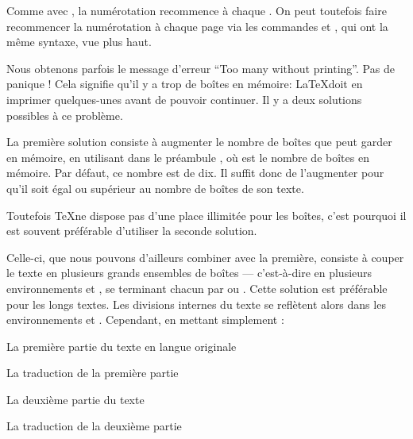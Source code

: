 \begin{attention}
Comme avec , la numérotation recommence à chaque . On peut toutefois faire recommencer la numérotation  à chaque page via les commandes  et , qui ont la même syntaxe, vue plus haut.
\end{attention}

Nous obtenons parfois le message d'erreur \enquote{Too many  without printing}. Pas de panique ! Cela signifie qu'il y a trop de boîtes en mémoire: \LaTeX  doit en imprimer quelques-unes avant de pouvoir continuer.  Il y a deux solutions possibles à ce problème.

La première solution consiste à  augmenter le nombre de boîtes que  peut garder en mémoire, en utilisant dans le préambule , où  est le nombre de boîtes en mémoire. Par défaut, ce nombre est de dix. Il suffit donc de l'augmenter  pour qu'il soit égal ou supérieur au nombre de boîtes de son  texte. 

Toutefois \TeX ne dispose pas d'une place illimitée pour les boîtes, c'est pourquoi il est souvent préférable d'utiliser la seconde solution.


Celle-ci, que nous pouvons d'ailleurs combiner avec la première, consiste à  couper le texte en plusieurs grands ensembles de boîtes --- c'est-à-dire en plusieurs environnements  et , se terminant chacun par  ou .  Cette solution est préférable pour les longs textes. Les divisions internes du texte se reflètent alors dans les environnements  et . Cependant,  en mettant simplement :

\begin{latexcode}
\begin{pages}  
\begin{Leftside}  \beginnumbering 
La première partie du texte en langue originale
\endnumbering  \end{Leftside} 
 
\begin{Rightside} \beginnumbering
La traduction de la première partie
\endnumbering \end{Rightside} 
 \Pages
 
\begin{Leftside} \beginnumbering  
La deuxième partie du texte 
\endnumbering  \end{Leftside} 
 
\begin{Rightside}  \beginnumbering
La traduction de la deuxième partie
\endnumbering \end{Rightside} 
 \Pages

  \end{pages}
\end{latexcode}

